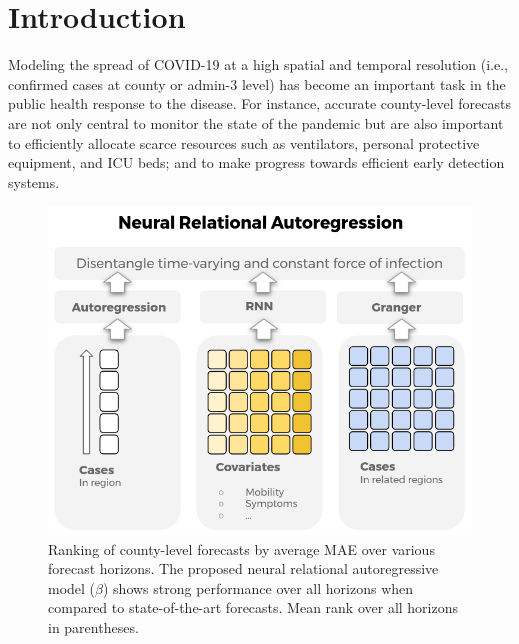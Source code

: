 \documentclass{article}
\newcommand{\bAR}{\ensuremath{\beta}\text{-AR}\xspace}
\begin{document}
\section{Introduction}
\label{sec:orgcdd5422}
Modeling the spread of COVID-19 at a high spatial and temporal resolution (i.e.,
confirmed cases at county or admin-3 level) has become an important task in the
public health response to the disease. For instance, accurate county-level
forecasts are not only central to monitor the state of the pandemic but are also
important to efficiently allocate scarce resources such as ventilators, personal
protective equipment, and ICU beds; and to make progress towards efficient early
detection systems.


\begin{figure}[t]
\includegraphics[width=.9\columnwidth]{img/nrar.png}
\caption{Ranking of county-level forecasts by average MAE over various forecast horizons. The proposed neural relational autoregressive model (\bAR) shows strong performance over all horizons when compared to state-of-the-art forecasts. Mean rank over all horizons in parentheses.}
\label{fig:ranking-covidhub-mae}
\end{figure}
\end{document}
